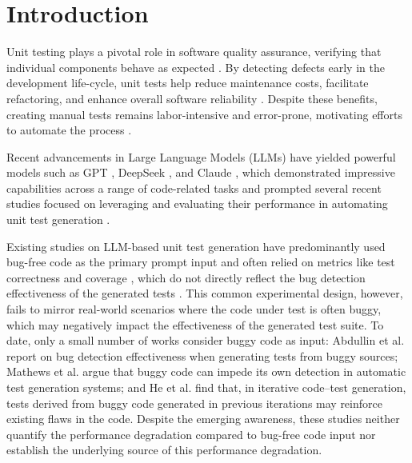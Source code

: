 \documentclass[acmsmall]{acmart}
\begin{document}
\section{Introduction}
Unit testing plays a pivotal role in software quality assurance, verifying that individual components behave as expected \cite{sommerville2011software}. By detecting defects early in the development life-cycle, unit tests help reduce maintenance costs, facilitate refactoring, and enhance overall software reliability \cite{SoftwareTestingWithLLMSurvey}. Despite these benefits, creating manual tests remains labor-intensive and error-prone, motivating efforts to automate the process \cite{SurveyOnUnitTestPracticesandProblems}.

Recent advancements in Large Language Models (LLMs) have yielded powerful models such as GPT \cite{openai2024gpt4ocard}, DeepSeek \cite{deepseekai2025deepseekv3technicalreport}, and Claude \cite{anthropic2024claude35sonnet}, which demonstrated impressive capabilities across a range of code-related tasks and prompted several recent studies focused on leveraging and evaluating their performance in automating unit test generation \cite{ChatUniTestFSE2024Demo, EvalImprChatgptUTGenFSE2024, TestGenLLMandMutIST, OnLLMUTGenEvalASE2024, EmpEvalforLLMUTAutoGenTSE}.

Existing studies on LLM-based unit test generation have predominantly used bug-free code as the primary prompt input and often relied on metrics like test correctness and coverage \cite{ChatUniTestFSE2024Demo, EvalImprChatgptUTGenFSE2024, TestGenLLMandMutIST, OnLLMUTGenEvalASE2024, EmpEvalforLLMUTAutoGenTSE}, which do not directly reflect the bug detection effectiveness of the generated tests \cite{CovNotStronglyCorrWithEffICSE2014}. This common experimental design, however, fails to mirror real-world scenarios where the code under test is often buggy, which may negatively impact the effectiveness of the generated test suite. To date, only a small number of works consider buggy code as input: Abdullin et al. \cite{abdullin2025testwarscomparativestudy} report on bug detection effectiveness when generating tests from buggy sources; Mathews et al. \cite{buggycodeprevent} argue that buggy code can impede its own detection in automatic test generation systems; and He et al. \cite{he2025usepropertybasedtestingbridge} find that, in iterative code–test generation, tests derived from buggy code generated in previous iterations may reinforce existing flaws in the code. Despite the emerging awareness, these studies neither quantify the performance degradation compared to bug-free code input nor establish the underlying source of this performance degradation. 
\end{document}
